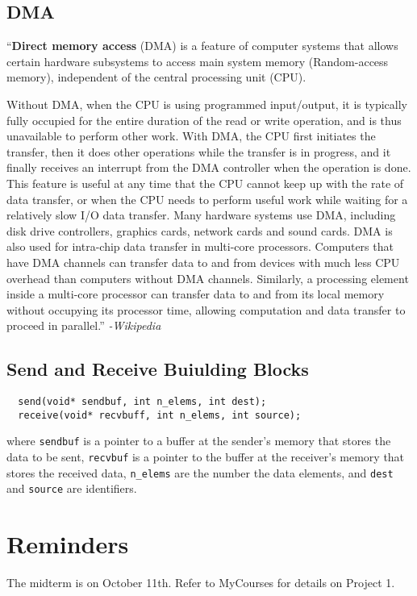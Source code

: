 \documentclass[letterpaper, 12pt]{math}
\begin{document}
\subsection*{DMA}
``\textbf{Direct memory access} (DMA) is a feature of computer systems that
allows certain hardware subsystems to access main system memory (Random-access
memory), independent of the central processing unit (CPU). \par
Without DMA, when the CPU is using programmed input/output, it is typically
fully occupied for the entire duration of the read or write operation, and is
thus unavailable to perform other work. With DMA, the CPU first initiates the
transfer, then it does other operations while the transfer is in progress, and
it finally receives an interrupt from the DMA controller when the operation is
done. This feature is useful at any time that the CPU cannot keep up with the
rate of data transfer, or when the CPU needs to perform useful work while
waiting for a relatively slow I/O data transfer. Many hardware systems use
DMA, including disk drive controllers, graphics cards, network cards and
sound cards. DMA is also used for intra-chip data transfer in multi-core
processors. Computers that have DMA channels can transfer data to and from
devices with much less CPU overhead than computers without DMA channels.
Similarly, a processing element inside a multi-core processor can transfer
data to and from its local memory without occupying its processor time,
allowing computation and data transfer to proceed in parallel.''
\textit{-Wikipedia}

\subsection*{Send and Receive Buiulding Blocks}
\begin{lstlisting}
  send(void* sendbuf, int n_elems, int dest);
  receive(void* recvbuff, int n_elems, int source);
\end{lstlisting}
where \texttt{sendbuf} is a pointer to a buffer at the sender's memory that
stores the data to be sent, \texttt{recvbuf} is a pointer to the buffer at
the receiver's memory that stores the received data, \texttt{n\_elems} are
the number the data elements, and \texttt{dest} and \texttt{source} are
identifiers.

\section*{Reminders}
The midterm is on October 11th.
Refer to MyCourses for details on Project 1. \\
\end{document}
